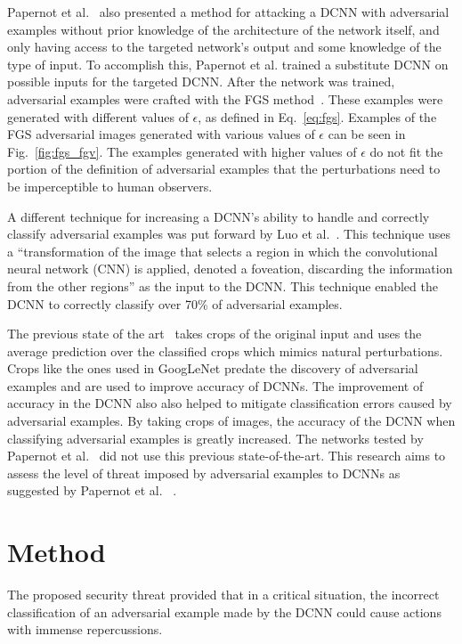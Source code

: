 \documentclass[conference]{IEEEtran}
\begin{document}
Papernot et al.~\cite{c12} also presented a method for attacking a DCNN with adversarial examples without prior knowledge of the architecture of the network itself, and only having access to the targeted network's output and some knowledge of the type of input.  To accomplish this, Papernot et al. trained a substitute DCNN on possible inputs for the targeted DCNN.  After the network was trained, adversarial examples were crafted with the FGS method~\cite{c5}.  These examples were generated with different values of \(\epsilon\), as defined in Eq.~\ref{eq:fgs}.  Examples of the FGS adversarial images generated with various values of \(\epsilon\) can be seen in Fig.~\ref{fig:fgs_fgv}.  The examples generated with higher values of \(\epsilon\) do not fit the portion of the definition of adversarial examples that the perturbations need to be imperceptible to human observers.

A different technique for increasing a DCNN's ability to handle and correctly classify adversarial examples was put forward by Luo et al.~\cite{c15}.  This technique uses a ``transformation of the image that selects a region in which the convolutional neural network (CNN) is applied, denoted a foveation, discarding the information from the other regions'' as the input to the DCNN.  This technique enabled the DCNN to correctly classify over 70\% of adversarial examples.

The previous state of the art~\cite{c18} takes crops of the original input and uses the average prediction over the classified crops which mimics natural perturbations.  Crops like the ones used in GoogLeNet predate the discovery of adversarial examples and are used to improve accuracy of DCNNs.  The improvement of accuracy in the DCNN also also helped to mitigate classification errors caused by adversarial examples.  By taking crops of images, the accuracy of the DCNN when classifying adversarial examples is greatly increased.  The networks tested by Papernot et al.~\cite{c3} did not use this previous state-of-the-art.  This research aims to assess the level of threat imposed by adversarial examples to DCNNs as suggested by Papernot et al. ~\cite{c3}. 

\section{Method}
 The proposed security threat provided that in a critical situation, the incorrect classification of an adversarial example made by the DCNN could cause actions with immense repercussions.
 
\end{document}
